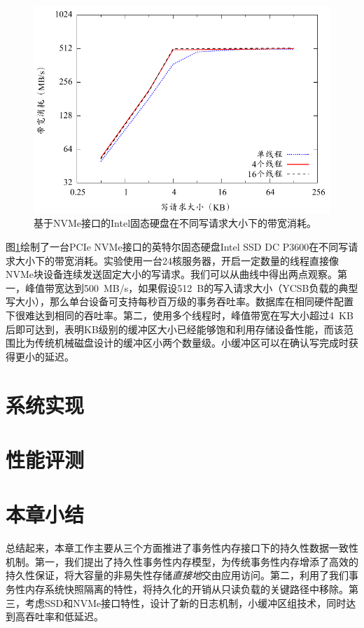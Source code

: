 \begin{figure}[t]
\centering
\includegraphics[width=0.9\columnwidth]{figures/nvme-bandwidth}
\caption{基于NVMe接口的Intel固态硬盘在不同写请求大小下的带宽消耗。}
\label{fig-nvme-bandwidth}
\end{figure}

图\ref{fig-nvme-bandwidth}绘制了一台PCIe NVMe接口的英特尔固态硬盘Intel SSD DC P3600在不同写请求大小下的带宽消耗。实验使用一台24核服务器，开启一定数量的线程直接像NVMe块设备连续发送固定大小的写请求。我们可以从曲线中得出两点观察。第一，峰值带宽达到500~MB/s，如果假设512~B的写入请求大小（YCSB负载的典型写大小），那么单台设备可支持每秒百万级的事务吞吐率。数据库在相同硬件配置下很难达到相同的吞吐率。第二，使用多个线程时，峰值带宽在写大小超过4~KB后即可达到，表明KB级别的缓冲区大小已经能够饱和利用存储设备性能，而该范围比为传统机械磁盘设计的缓冲区小两个数量级。小缓冲区可以在确认写完成时获得更小的延迟。

\section{系统实现}

\section{性能评测}

\section{本章小结}

总结起来，本章工作主要从三个方面推进了事务性内存接口下的持久性数据一致性机制。第一，我们提出了持久性事务性内存模型，为传统事务性内存增添了高效的持久性保证，将大容量的非易失性存储\emph{直接地}交由应用访问。第二，利用了我们事务性内存系统快照隔离的特性，将持久化的开销从只读负载的关键路径中移除。第三，考虑SSD和NVMe接口特性，设计了新的日志机制，小缓冲区组技术，同时达到高吞吐率和低延迟。


